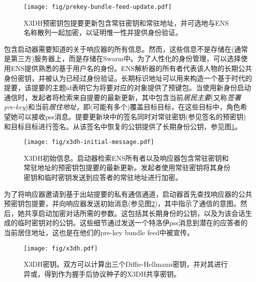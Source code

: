 \begin{figure}[htbp]
   \centering
   \texttt{[image: fig/prekey-bundle-feed-update.pdf]}
   \caption[X3DH预密钥包feed更新\statusgreen]{X3DH预密钥包提要更新包含常驻密钥和常驻地址，并可选地与ENS名称散列一起加密，以证明惟一性并提供身份验证。}
\label{fig:prekey-bundle-feed-update}
\end{figure}


包含启动器需要知道的关于响应器的所有信息。然而，这些信息不是存储在(通常是第三方)服务器上，而是存储在Swarm中。为了人性化的身份管理，可以选择使用ENS提供熟悉的基于用户名的身份。ENS解析器的所有者代表该人物的长期公共身份密钥，并被认为已经过身份验证。长期标识地址可以用来构造一个基于时代的提要，该提要的主题id表明它为将要对应的对象提供了预键包。当使用新身份启动通信时，发起者将检索来自提要的最新更新，其中包含当前\emph{居民主要}(又称\emph{签署pre-key})和当前\emph{居住地址}，即(可能有多个)覆盖目标目标，在这些目标中，角色希望她可以接收pss消息。提要更新块中的签名同时对常驻密钥(参见签名的预密钥)和目标目标进行签名。从该签名中恢复的公钥提供了长期身份公钥，参见图\ref{fig:prekey-bundle-feed-update}。


\begin{figure}[htbp]
   \centering
   \texttt{[image: fig/x3dh-initial-message.pdf]}
   \caption[X3DH初始消息]{X3DH初始信息。启动器检索ENS所有者以及响应器包含常驻密钥和常驻地址的预密钥包提要的最新更新。发起者使用常驻密钥将其身份密钥和临时密钥发送到应答者的常驻地址进行加密。 }
\label{fig:x3dh-initial-message}
\end{figure}


为了将响应器邀请到基于出站提要的私有通信通道，启动器首先查找响应器的公共预密钥包提要，并向响应器发送初始消息(参见图\ref{fig:x3dh-initial-message})，其中指示了通信的意图。然后，她共享启动加密对话所需的参数。这包括其长期身份的公钥，以及为该会话生成的临时密钥对的公钥。这些细节通过发送一个特洛伊pss消息到潜在的应答者的当前居住地址，这也是在他们的pre-key bundle feed中被宣传。 

\begin{figure}[htbp]
   \centering
   \texttt{[image: fig/x3dh.pdf]}
   \caption[X3DH密钥\statusgreen]{X3DH密钥。双方可以计算出三个Diffie-Hellmann密钥，并对其进行异或，得到作为握手后协议种子的X3DH共享密钥。}
   \label{fig:x3dh}
\end{figure}

